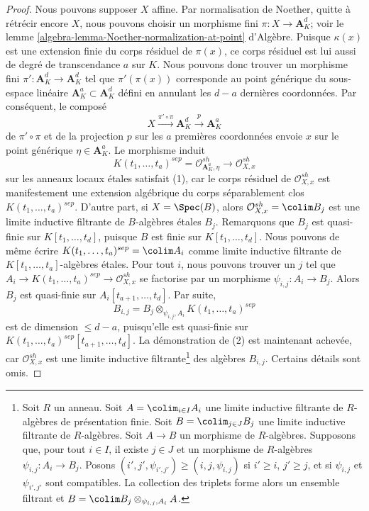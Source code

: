 \begin{proof}
Nous pouvons supposer $X$ affine. Par normalisation de Noether, quitte à
rétrécir encore $X$, nous pouvons choisir un morphisme fini
$\pi : X \to \mathbf{A}^d_K$; voir le
lemme \ref{algebra-lemma-Noether-normalization-at-point} d'Algèbre.
Puisque $\kappa(x)$ est une extension finie du corps résiduel de $\pi(x)$,
ce corps résiduel est lui aussi de degré de transcendance $a$ sur $K$.
Nous pouvons donc trouver un morphisme fini $\pi' : \mathbf{A}^d_K \to \mathbf{A}^d_K$
tel que $\pi'(\pi(x))$ corresponde au point générique du sous-espace
linéaire $\mathbf{A}^a_K \subset \mathbf{A}^d_K$ défini en annulant
les $d - a$ dernières coordonnées. Par conséquent, le composé
$$
X \xrightarrow{\pi' \circ \pi} \mathbf{A}^d_K \xrightarrow{p} \mathbf{A}^a_K
$$
de $\pi' \circ \pi$ et de la projection $p$ sur les $a$ premières coordonnées
envoie $x$ sur le point générique $\eta \in \mathbf{A}^a_K$. Le morphisme induit
$$
K(t_1, \ldots, t_a)^{sep} =
\mathcal{O}_{\mathbf{A}^a_K, \eta}^{sh}
\longrightarrow \mathcal{O}_{X, x}^{sh}
$$
sur les anneaux locaux étales satisfait (1), car le corps résiduel
de $\mathcal{O}_{X, x}^{sh}$ est manifestement une extension algébrique du corps
séparablement clos $K(t_1, \ldots, t_a)^{sep}$. D'autre part, si $X = \Spec(B)$,
alors $\mathcal{O}_{X, x}^{sh} = \colim B_j$ est une limite inductive filtrante
de $B$-algèbres étales $B_j$. Remarquons que $B_j$ est quasi-finie sur
$K[t_1, \ldots, t_d]$, puisque $B$ est finie sur $K[t_1, \ldots, t_d]$.
Nous pouvons de même écrire
$K(t_1, \ldots, t_a)^{sep} = \colim A_i$ comme limite inductive filtrante
de $K[t_1, \ldots, t_a]$-algèbres étales. Pour tout $i$, nous pouvons
trouver un $j$ tel que
$A_i \to K(t_1, \ldots, t_a)^{sep} \to \mathcal{O}_{X, x}^{sh}$
se factorise par un morphisme $\psi_{i, j} : A_i \to B_j$. Alors $B_j$ est quasi-finie
sur $A_i[t_{a + 1}, \ldots, t_d]$. Par suite,
$$
B_{i, j} = B_j \otimes_{\psi_{i, j}, A_i} K(t_1, \ldots, t_a)^{sep}
$$
est de dimension $\leq d - a$, puisqu'elle est quasi-finie sur
$K(t_1, \ldots, t_a)^{sep}[t_{a + 1}, \ldots, t_d]$.
La démonstration de (2) est maintenant achevée, car $\mathcal{O}_{X, x}^{sh}$ est une
limite inductive filtrante\footnote{Soit $R$ un anneau.
Soit $A = \colim_{i \in I} A_i$
une limite inductive filtrante de $R$-algèbres de présentation finie.
Soit $B = \colim_{j \in J} B_j$ une limite inductive filtrante de $R$-algèbres.
Soit $A \to B$ un morphisme de $R$-algèbres.
Supposons que, pour tout $i \in I$, il existe $j \in J$ et un morphisme de $R$-algèbres
$\psi_{i, j} : A_i \to B_j$.
Posons $(i', j', \psi_{i', j'}) \geq (i, j, \psi_{i, j})$ si
$i' \geq i$, $j' \geq j$, et si $\psi_{i, j}$ et $\psi_{i', j'}$
sont compatibles. La collection des triplets forme alors un
ensemble filtrant et $B = \colim B_j \otimes_{\psi_{i, j}, A_i} A$.}
des algèbres $B_{i, j}$. Certains détails sont omis.
\end{proof}

